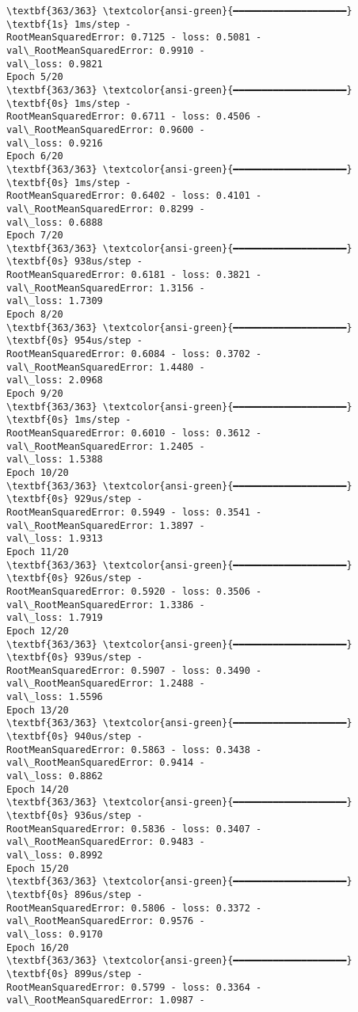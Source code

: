 \documentclass[12pt letter]{report}
\begin{document}
    \begin{Verbatim}[commandchars=\\\{\}]
\textbf{363/363} \textcolor{ansi-green}{━━━━━━━━━━━━━━━━━━━━} \textbf{1s} 1ms/step -
RootMeanSquaredError: 0.7125 - loss: 0.5081 - val\_RootMeanSquaredError: 0.9910 -
val\_loss: 0.9821
Epoch 5/20
\textbf{363/363} \textcolor{ansi-green}{━━━━━━━━━━━━━━━━━━━━} \textbf{0s} 1ms/step -
RootMeanSquaredError: 0.6711 - loss: 0.4506 - val\_RootMeanSquaredError: 0.9600 -
val\_loss: 0.9216
Epoch 6/20
\textbf{363/363} \textcolor{ansi-green}{━━━━━━━━━━━━━━━━━━━━} \textbf{0s} 1ms/step -
RootMeanSquaredError: 0.6402 - loss: 0.4101 - val\_RootMeanSquaredError: 0.8299 -
val\_loss: 0.6888
Epoch 7/20
\textbf{363/363} \textcolor{ansi-green}{━━━━━━━━━━━━━━━━━━━━} \textbf{0s} 938us/step -
RootMeanSquaredError: 0.6181 - loss: 0.3821 - val\_RootMeanSquaredError: 1.3156 -
val\_loss: 1.7309
Epoch 8/20
\textbf{363/363} \textcolor{ansi-green}{━━━━━━━━━━━━━━━━━━━━} \textbf{0s} 954us/step -
RootMeanSquaredError: 0.6084 - loss: 0.3702 - val\_RootMeanSquaredError: 1.4480 -
val\_loss: 2.0968
Epoch 9/20
\textbf{363/363} \textcolor{ansi-green}{━━━━━━━━━━━━━━━━━━━━} \textbf{0s} 1ms/step -
RootMeanSquaredError: 0.6010 - loss: 0.3612 - val\_RootMeanSquaredError: 1.2405 -
val\_loss: 1.5388
Epoch 10/20
\textbf{363/363} \textcolor{ansi-green}{━━━━━━━━━━━━━━━━━━━━} \textbf{0s} 929us/step -
RootMeanSquaredError: 0.5949 - loss: 0.3541 - val\_RootMeanSquaredError: 1.3897 -
val\_loss: 1.9313
Epoch 11/20
\textbf{363/363} \textcolor{ansi-green}{━━━━━━━━━━━━━━━━━━━━} \textbf{0s} 926us/step -
RootMeanSquaredError: 0.5920 - loss: 0.3506 - val\_RootMeanSquaredError: 1.3386 -
val\_loss: 1.7919
Epoch 12/20
\textbf{363/363} \textcolor{ansi-green}{━━━━━━━━━━━━━━━━━━━━} \textbf{0s} 939us/step -
RootMeanSquaredError: 0.5907 - loss: 0.3490 - val\_RootMeanSquaredError: 1.2488 -
val\_loss: 1.5596
Epoch 13/20
\textbf{363/363} \textcolor{ansi-green}{━━━━━━━━━━━━━━━━━━━━} \textbf{0s} 940us/step -
RootMeanSquaredError: 0.5863 - loss: 0.3438 - val\_RootMeanSquaredError: 0.9414 -
val\_loss: 0.8862
Epoch 14/20
\textbf{363/363} \textcolor{ansi-green}{━━━━━━━━━━━━━━━━━━━━} \textbf{0s} 936us/step -
RootMeanSquaredError: 0.5836 - loss: 0.3407 - val\_RootMeanSquaredError: 0.9483 -
val\_loss: 0.8992
Epoch 15/20
\textbf{363/363} \textcolor{ansi-green}{━━━━━━━━━━━━━━━━━━━━} \textbf{0s} 896us/step -
RootMeanSquaredError: 0.5806 - loss: 0.3372 - val\_RootMeanSquaredError: 0.9576 -
val\_loss: 0.9170
Epoch 16/20
\textbf{363/363} \textcolor{ansi-green}{━━━━━━━━━━━━━━━━━━━━} \textbf{0s} 899us/step -
RootMeanSquaredError: 0.5799 - loss: 0.3364 - val\_RootMeanSquaredError: 1.0987 -

\end{Verbatim}
\end{document}

